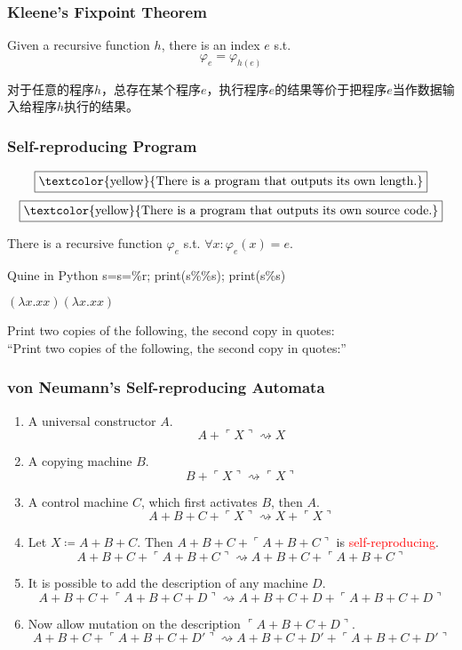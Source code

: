\documentclass[UTF8,11pt,colorlinks,compress,openany]{beamer}%
\begin{document}
\begin{frame}\frametitle{Kleene's Fixpoint Theorem}
\setlength\abovedisplayskip{0pt}
\setlength\belowdisplayskip{0pt}
	\begin{theorem}
		Given a recursive function $h$, there is an index $e$ s.t.
		\[\varphi_e=\varphi_{h(e)}\]
	\end{theorem}
对于任意的程序$h$，总存在某个程序$e$，执行程序$e$的结果等价于把程序$e$当作数据输入给程序$h$执行的结果。
\end{frame}

\begin{frame}\frametitle{Self-reproducing Program}
	\[\fbox{\textcolor{yellow}{There is a program that outputs its own length.}}\]
	\[\fbox{\textcolor{yellow}{There is a program that outputs its own source code.}}\]
	\begin{corollary}
		There is a recursive function $\varphi_e$ s.t. $\forall x: \varphi_e(x)=e$.
	\end{corollary}
\begin{block}{Quine in Python}
s=\textquotesingle s=\%r; print(s\%\%s)\textquotesingle; print(s\%s)
\end{block}
\centerline{$(\lambda x.xx)(\lambda x.xx)$}
\begin{block}{}
	Print two copies of the following, the second copy in quotes:\\
	``Print two copies of the following, the second copy in quotes:''
\end{block}
	\centerline{\fbox{\textcolor{green}{DNA / mutation / evolution}}}
\end{frame}

\begin{frame}\frametitle{von Neumann's Self-reproducing Automata}
	\begin{enumerate}
		\item A universal constructor $A$.
		\[A+\ulcorner X\urcorner\rightsquigarrow X\]
		\item A copying machine $B$.
		\[B+\ulcorner X\urcorner\rightsquigarrow\ulcorner X\urcorner\]
		\item A control machine $C$, which first activates $B$, then $A$.
		\[A+B+C+\ulcorner X\urcorner\rightsquigarrow X+\ulcorner X\urcorner\]
		\item Let $X\coloneqq A+B+C$. {Then} $A+B+C+\ulcorner A+B+C\urcorner$ is \textcolor{red}{self-reproducing}.
		\[A+B+C+\ulcorner A+B+C\urcorner\rightsquigarrow A+B+C+\ulcorner A+B+C\urcorner\]
		\item It is possible to add the description of any machine $D$.
		\[A+B+C+\ulcorner A+B+C+D\urcorner\rightsquigarrow A+B+C+D+\ulcorner A+B+C+D\urcorner\]
		\item Now allow mutation on the description $\ulcorner A+B+C+D\urcorner$.
		\[A+B+C+\ulcorner A+B+C+D'\urcorner\rightsquigarrow A+B+C+D'+\ulcorner A+B+C+D'\urcorner\]
	\end{enumerate}
\end{frame}
\end{document}

